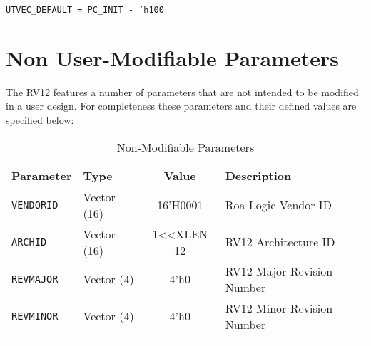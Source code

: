 \texttt{UTVEC\_DEFAULT = PC\_INIT - 'h100}

\section{Non User-Modifiable Parameters} \label{non-user-modifiable-parameters}

The RV12 features a number of parameters that are not intended to be
modified in a user design. For completeness these parameters and their
defined values are specified below:

\begin{longtable}[]{@{}llcl@{}}
\toprule
Parameter & Type & Value & Description\tabularnewline
\midrule
\endhead
\texttt{VENDORID} & Vector (16) & 16'H0001 & Roa Logic Vendor ID\tabularnewline
\texttt{ARCHID} & Vector (16) & 1\textless{}\textless{}XLEN \textbar{} 12 & RV12
Architecture ID\tabularnewline
\texttt{REVMAJOR} & Vector (4) & 4'h0 & RV12 Major Revision Number\tabularnewline
\texttt{REVMINOR} & Vector (4) & 4'h0 & RV12 Minor Revision Number\tabularnewline
\bottomrule
\caption{Non-Modifiable Parameters}
\label{tab:nonmod-parameters}
\end{longtable}
